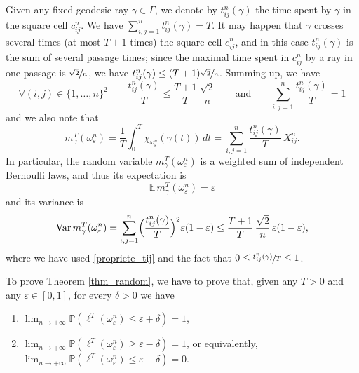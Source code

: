 \documentclass[JEP,XML,SOM,Unicode, NoEqCountersInSection,NoFloatCountersInSection,published]{cedram}
\newenvironment{enumeratei}
{\bgroup\def\theenumi{\roman{enumi}}\def\theenumii{\arabic{enumii}}\begin{enumerate}}
{\end{enumerate}\egroup}
\theoremstyle{definition}
\begin{document}
Given any fixed geodesic ray $\gamma\in\Gamma$, we denote by $t_{ij}^n(\gamma)$ the time spent by $\gamma$ in the square cell $c_{ij}^n$. We have $\sum_{i,j=1}^nt_{ij}^n(\gamma)=T$.
It may happen that $\gamma$ crosses several times (at most $T+1$ times) the square cell $c_{ij}^n$, and in this case $t_{ij}^n(\gamma)$ is the sum of several passage times; since the maximal time spent in $c_{ij}^n$ by a ray in one passage is $\sfrac{\sqrt{2}}{n}$, we have $t_{ij}^n(\gamma) \leq (T+1) \sfrac{\sqrt{2}}{n}$.
Summing up, we have
\begin{equation}\label{propriete_tij}
\forall (i,j)\in \{1,\ldots,n\}^2\qquad \frac{t_{ij}^n(\gamma)}{T} \leq \frac{T+1}{T}\, \frac{\sqrt{2}}{n}
\qquad\textrm{and}\qquad
\sum_{i,j=1}^n \frac{t_{ij}^n(\gamma)}{T} = 1
\end{equation}
and we also note that
\begin{equation}\label{18:26}
m^T_\gamma(\omega_\varepsilon^n) = \frac{1}{T} \int_0^{T} \chi_{\omega_\varepsilon^n} (\gamma(t) ) \, dt = \sum_{i,j=1}^n \frac{t_{ij}^n(\gamma)}{T}\, X_{ij}^n.
\end{equation}
In particular, the random variable $m^T_\gamma(\omega_\varepsilon^n)$ is a weighted sum of independent Bernoulli laws, and thus its expectation is
\begin{equation}\label{expectation_m}
\mathbb{E}\,m^T_\gamma(\omega_\varepsilon^n) = \varepsilon
\end{equation}
and its variance is
\begin{equation}\label{variance_m}
\mathrm{Var}\,m^T_\gamma(\omega_\varepsilon^n) = \sum_{i,j=1}^n \Bigl( \frac{t_{ij}^n(\gamma)}{T} \Bigr)^2 \varepsilon(1-\varepsilon)
\leq \frac{T+1}{T}\, \frac{\sqrt{2}}{n}\,\varepsilon(1-\varepsilon),
\end{equation}
where we have used \eqref{propriete_tij} and the fact that $0\leq \sfrac{t_{ij}^n(\gamma)}{T}\leq 1$.

To prove Theorem \ref{thm_random}, we have to prove that, given any $T>0$ and any $\varepsilon\in[0,1]$, for every $\delta>0$ we have
\begin{enumeratei}
\item\label{igd1} $\displaystyle\lim_{n\to +\infty} \mathbb{P}\left( \ell^T(\omega_\varepsilon^n) \leq \varepsilon + \delta \right) = 1$,
\item\label{igd2} $\displaystyle\lim_{n\to +\infty} \mathbb{P}\left( \ell^T(\omega_\varepsilon^n) \geq \varepsilon - \delta \right) = 1$, or equivalently, $\displaystyle\lim_{n\to +\infty} \mathbb{P}\left( \ell^T(\omega_\varepsilon^n) \leq \varepsilon - \delta \right) = 0$.
\end{enumeratei}
\end{document}
